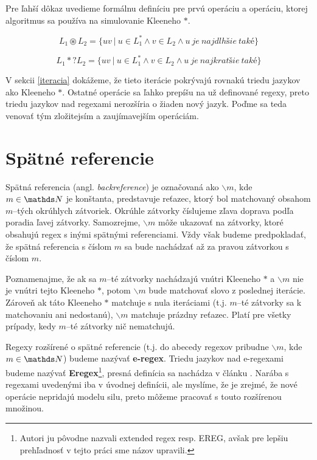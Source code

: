 Pre ľahší dôkaz uvedieme formálnu definíciu pre prvú operáciu a operáciu, ktorej algoritmus sa používa na simulovanie Kleeneho $*$.

\begin{df}
$$ L_{1} \circledast L_{2} = \lbrace uv ~|~ u \in L_1^* \land v \in L_2 \land u~je~najdlhšie~také \rbrace$$
\end{df}

\begin{df}
$$ L_{1} *? L_{2} = \lbrace uv ~|~ u \in L_1^* \land v \in L_2 \land u~je~najkratšie~také \rbrace $$
\end{df}

V sekcii \ref{iteracia} dokážeme, že tieto iterácie pokrývajú rovnakú triedu jazykov ako Kleeneho $*$. Ostatné operácie sa ľahko prepíšu na už definované regexy, preto triedu jazykov nad regexami nerozšíria o žiaden nový jazyk. Poďme sa teda venovať tým zložitejsím a zaujímavejším operáciám.

\section{Spätné referencie}\label{chap:backref1}

Spätná referencia (angl. \textit{backreference}) je označovaná ako $ \backslash m $, kde $m \in \N$ je kon\-štan\-ta, predstavuje reťazec, ktorý bol matchovaný obsahom $m$--tých okrúhlych zátvoriek. Okrúhle zátvorky číslujeme zľava doprava podľa poradia ľavej zátvorky. Samozrejme, $\backslash m$ môže ukazovať na zátvorky, ktoré obsahujú regex s inými spätnými referenciami. Vždy však budeme predpokladať, že spätná referencia s číslom $m$ sa bude nachádzať až za pravou zátvorkou s číslom $m$.

Poznamenajme, že ak sa $m$--té zátvorky nachádzajú vnútri Kleeneho $*$ a $\backslash m$ nie je vnútri tejto Kleeneho $*$, potom $\backslash m$ bude matchovať slovo z poslednej iterácie. Zároveň ak táto Kleeneho $*$ matchuje s nula iteráciami (t.j. $m$--té zátvorky sa k matchovaniu ani nedostanú), $\backslash m$ matchuje prázdny reťazec. Platí pre všetky prípady, kedy $m$--té zátvorky nič nematchujú.

Regexy rozšírené o spätné referencie (t.j. do abecedy regexov pribudne $\backslash m$, kde $m \in \N$) budeme nazývať \textbf{e-regex}. Triedu jazykov nad e-regexami budeme nazývať \textbf{Eregex}\footnote{Autori ju pôvodne nazvali extended regex resp. EREG, avšak pre lepšiu prehľadnosť v tejto práci sme názov upravili.}, presná definícia sa nachádza v článku \cite{ExtendedRegexPower}.  Narába s regexami uvedenými iba v úvodnej definícii, ale myslíme, že je zrejmé, že nové operácie nepridajú modelu silu, preto môžeme pracovať s touto rozšírenou množinou.

